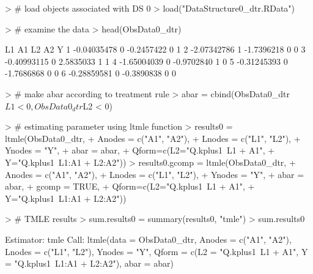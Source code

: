 \documentclass[answers]{exam}
\begin{document}
\begin{solution}
\begin{Schunk}
\begin{Sinput}
> # load objects associated with DS 0
> load("DataStructure0_dtr.RData")
\end{Sinput}
\end{Schunk}
\begin{Schunk}
\begin{Sinput}
> # examine the data
> head(ObsData0_dtr)
\end{Sinput}
\begin{Soutput}
           L1 A1         L2 A2 Y
1 -0.04035478  0 -0.2457422  0 1
2 -2.07342786  1 -1.7396218  0 0
3 -0.40993115  0  2.5835033  1 1
4 -1.65004039  0 -0.9702840  1 0
5 -0.31245393  0 -1.7686868  0 0
6 -0.28859581  0 -0.3890838  0 0
\end{Soutput}
\end{Schunk}
\begin{Schunk}
\begin{Sinput}
> # make abar according to treatment rule
> abar = cbind(ObsData0_dtr$L1 < 0, ObsData0_dtr$L2 < 0)
\end{Sinput}
\end{Schunk}
\begin{Schunk}
\begin{Sinput}
> # estimating parameter using ltmle function
> results0 = ltmle(ObsData0_dtr, 
+                    Anodes = c("A1", "A2"), 
+                    Lnodes = c("L1", "L2"), 
+                    Ynodes = "Y", 
+                    abar = abar, 
+                    Qform=c(L2="Q.kplus1~L1 + A1", 
+                            Y="Q.kplus1~L1:A1 + L2:A2"))
> results0.gcomp = ltmle(ObsData0_dtr, 
+                        Anodes = c("A1", "A2"), 
+                        Lnodes = c("L1", "L2"), 
+                        Ynodes = "Y", 
+                        abar = abar,
+                        gcomp = TRUE,
+                        Qform=c(L2="Q.kplus1~L1 + A1", 
+                                Y="Q.kplus1~L1:A1 + L2:A2"))
\end{Sinput}
\end{Schunk}
\begin{Schunk}
\begin{Sinput}
> # TMLE results
> sum.results0 = summary(results0, "tmle")
> sum.results0
\end{Sinput}
\begin{Soutput}
Estimator:  tmle 
Call:
ltmle(data = ObsData0_dtr, Anodes = c("A1", "A2"), Lnodes = c("L1", 
    "L2"), Ynodes = "Y", Qform = c(L2 = "Q.kplus1~L1 + A1", Y = "Q.kplus1~L1:A1 + L2:A2"), 
    abar = abar)


\end{Soutput}
\end{Schunk}
\end{solution}
\end{document}

